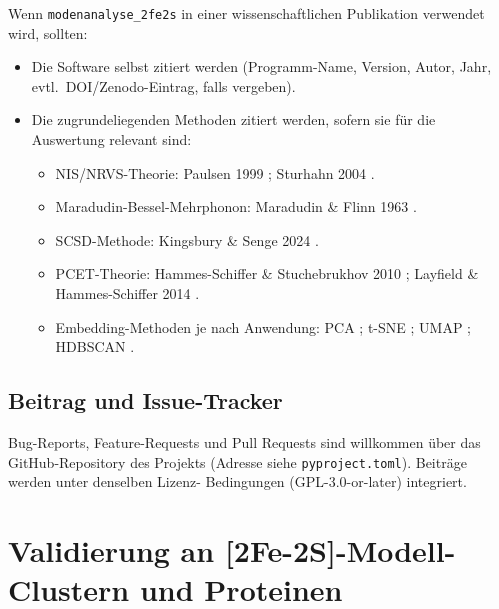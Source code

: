\documentclass[11pt,a4paper,twoside]{article}
\theoremstyle{remark}
\begin{document}
Wenn \texttt{modenanalyse\_2fe2s} in einer wissenschaftlichen
Publikation verwendet wird, sollten:

\begin{itemize}
  \item Die Software selbst zitiert werden (Programm-Name, Version,
        Autor, Jahr, evtl.\ DOI/Zenodo-Eintrag, falls vergeben).
  \item Die zugrundeliegenden Methoden zitiert werden, sofern sie f\"ur
        die Auswertung relevant sind:
        \begin{itemize}
          \item NIS/NRVS-Theorie: Paulsen 1999 \cite{Paulsen1999};
                Sturhahn 2004 \cite{Sturhahn2004}.
          \item Maradudin-Bessel-Mehrphonon: Maradudin \& Flinn 1963
                \cite{MaradudinFlinn1963}.
          \item SCSD-Methode: Kingsbury \& Senge 2024
                \cite{Kingsbury2024}.
          \item PCET-Theorie: Hammes-Schiffer \& Stuchebrukhov 2010
                \cite{HammesSchiffer2010};
                Layfield \& Hammes-Schiffer 2014
                \cite{LayfieldHammesSchiffer2014}.
          \item Embedding-Methoden je nach Anwendung: PCA
                \cite{Pearson1901}; t-SNE \cite{vanDerMaaten2008};
                UMAP \cite{McInnes2018}; HDBSCAN \cite{Campello2013}.
        \end{itemize}
\end{itemize}

\subsection{Beitrag und Issue-Tracker}

Bug-Reports, Feature-Requests und Pull Requests sind willkommen \"uber
das GitHub-Repository des Projekts (Adresse siehe
\texttt{pyproject.toml}). Beitr\"age werden unter denselben Lizenz-
Bedingungen (GPL-3.0-or-later) integriert.


\section{Validierung an [2Fe-2S]-Modell-Clustern und Proteinen}
\label{sec:validierung}
\end{document}

